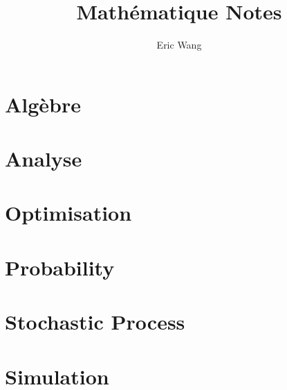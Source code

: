 \documentclass{book}
\begin{document}
\title{Math\'ematique Notes}
\author{Eric Wang}
\maketitle
\newpage
\tableofcontents
\newpage

\part{Alg\`ebre}









\part{Analyse}

\part{Optimisation}



\part{Probability}


\part{Stochastic Process}


\part{Simulation}

\end{document}
